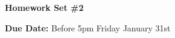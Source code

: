 


\thispagestyle{fancy}






\begin{center}
{\huge \textbf{Homework Set \#2}}
\large

{\textbf{ Due Date:} Before 5pm Friday January 31st  }
\end{center}

